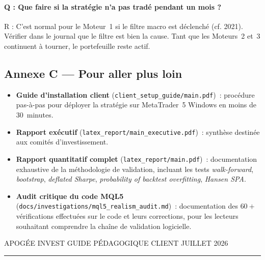 \documentclass[11pt, a4paper]{scrartcl}
\begin{document}
\paragraph{Q : Que faire si la stratégie n'a pas tradé pendant un mois ?}
R : C'est normal pour le Moteur~1 si le filtre macro est déclenché (cf. 2021). Vérifier dans le journal que le filtre est bien la cause. Tant que les Moteurs~2 et~3 continuent à tourner, le portefeuille reste actif.

\subsection*{Annexe C --- Pour aller plus loin}

\begin{itemize}
\item \textbf{Guide d'installation client} (\texttt{client\_setup\_guide/main.pdf})~: procédure pas-à-pas pour déployer la stratégie sur MetaTrader~5 Windows en moins de 30~minutes.
\item \textbf{Rapport exécutif} (\texttt{latex\_report/main\_executive.pdf})~: synthèse destinée aux comités d'investissement.
\item \textbf{Rapport quantitatif complet} (\texttt{latex\_report/main.pdf})~: documentation exhaustive de la méthodologie de validation, incluant les tests \emph{walk-forward}, \emph{bootstrap}, \emph{deflated Sharpe}, \emph{probability of backtest overfitting}, \emph{Hansen SPA}.
\item \textbf{Audit critique du code MQL5} (\texttt{docs/investigations/mql5\_realism\_audit.md})~: documentation des $60+$ vérifications effectuées sur le code et leurs corrections, pour les lecteurs souhaitant comprendre la chaîne de validation logicielle.
\end{itemize}

\vspace{2cm}

\begin{center}
{\interspaced\color{apogeeGold}\footnotesize APOGÉE INVEST \enskip\textbullet\enskip GUIDE PÉDAGOGIQUE CLIENT \enskip\textbullet\enskip JUILLET 2026\par}

\vspace{0.3cm}

{\color{apogeeGold}\rule{0.4\textwidth}{0.4pt}}
\end{center}
\end{document}
